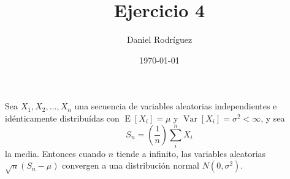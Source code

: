\documentclass{article}
\title{Ejercicio 4}
\author{Daniel Rodríguez}
\date{\today}
\begin{document}
    \maketitle
    Sea $X_1,X_2,...,X_n$ una secuencia de variables
    aleatorias independientes e idénticamente distribuídas
    con $\operatorname{E}[X_i] = \mu$ y $\operatorname{Var}[X_i]=\sigma^2 < \infty$,
    y sea 
    \begin{equation*}
        S_n = (\frac{1}{n})\sum_{i}^{n}X_i
    \end{equation*}
    la media. Entonces cuando $n$ tiende a infinito, las
    variables aleatorias $\sqrt{n}(S_n - \mu)$ convergen a
    una distribución normal $N(0, \sigma^2)$.
\end{document}
